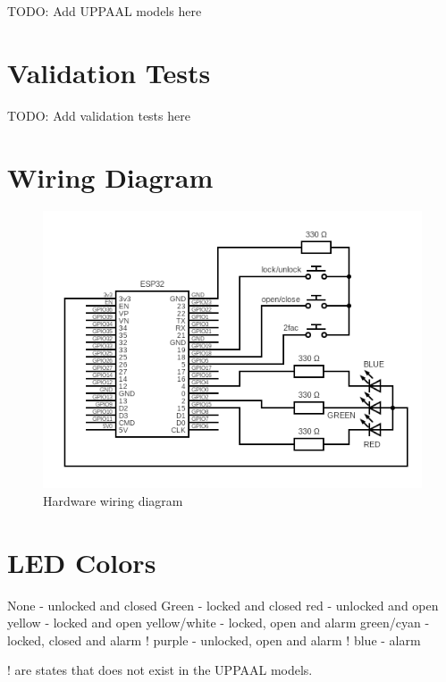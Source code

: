 TODO: Add UPPAAL models here

\section{Validation Tests}
\label{app:ValidationTests}

TODO: Add validation tests here

\section{Wiring Diagram}
\label{app:WiringDiagram}

\begin{figure}[tbh]
\includegraphics[width=.95\textwidth]{./../circuit/circuit.png}
\caption{Hardware wiring diagram}
\label{app:fig:WiringDiagram}
\end{figure}

\section{LED Colors}
\label{app:LEDColors}
\newline
None - unlocked and closed
Green - locked and closed
red - unlocked and open
yellow - locked and open
yellow/white - locked, open and alarm
green/cyan - locked, closed and alarm
! purple - unlocked, open and alarm
! blue - alarm

! are states that does not exist in the UPPAAL models.